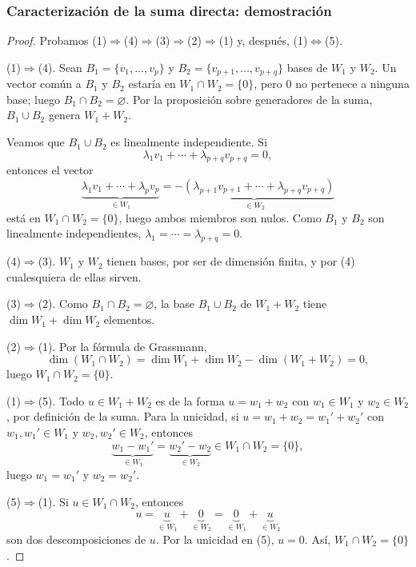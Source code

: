 \begin{frame}[allowframebreaks, t]
    \frametitle{Caracterización de la suma directa: demostración}

    \begin{proof}
        Probamos (1)$\Rightarrow$(4)$\Rightarrow$(3)$\Rightarrow$(2)$\Rightarrow$(1)
        y, después, (1)$\Leftrightarrow$(5).

        \alert{(1)$\Rightarrow$(4).} Sean $B_1=\{v_1,\ldots,v_p\}$ y
        $B_2=\{v_{p+1},\ldots,v_{p+q}\}$ bases de $W_1$ y $W_2$. Un vector común a
        $B_1$ y $B_2$ estaría en $W_1\cap W_2=\{0\}$, pero $0$ no pertenece
        a ninguna base; luego $B_1\cap B_2=\varnothing$. Por la proposición
        sobre generadores de la suma, $B_1\cup B_2$ genera $W_1+W_2$.

        Veamos que $B_1\cup B_2$ es linealmente independiente. Si
        \[
            \lambda_1v_1+\cdots+\lambda_{p+q}v_{p+q}=0,
        \]
        entonces el vector
        \[
            \underbrace{\lambda_1v_1+\cdots+\lambda_pv_p}_{\in W_1}
            =\underbrace{-(\lambda_{p+1}v_{p+1}+\cdots+\lambda_{p+q}v_{p+q})}_{\in W_2}
        \]
        está en $W_1\cap W_2=\{0\}$, luego ambos miembros son nulos. Como
        $B_1$ y $B_2$ son linealmente independientes,
        $\lambda_1=\cdots=\lambda_{p+q}=0$.

        \framebreak

        \alert{(4)$\Rightarrow$(3).} $W_1$ y $W_2$ tienen bases, por ser de
        dimensión finita, y por (4) cualesquiera de ellas sirven.

        \medskip

        \alert{(3)$\Rightarrow$(2).} Como $B_1\cap B_2=\varnothing$, la base
        $B_1\cup B_2$ de $W_1+W_2$ tiene $\dim W_1+\dim W_2$ elementos.

        \medskip

        \alert{(2)$\Rightarrow$(1).} Por la fórmula de Grassmann,
        \[
            \dim(W_1\cap W_2)=\dim W_1+\dim W_2-\dim(W_1+W_2)=0,
        \]
        luego $W_1\cap W_2=\{0\}$.

        \framebreak

        \alert{(1)$\Rightarrow$(5).} Todo $u\in W_1+W_2$ es de la forma
        $u=w_1+w_2$ con $w_1\in W_1$ y $w_2\in W_2$, por definición de la
        suma. Para la unicidad, si $u=w_1+w_2=w_1'+w_2'$ con
        $w_1,w_1'\in W_1$ y $w_2,w_2'\in W_2$, entonces
        \[
            \underbrace{w_1-w_1'}_{\in W_1}=\underbrace{w_2'-w_2}_{\in W_2}
            \in W_1\cap W_2=\{0\},
        \]
        luego $w_1=w_1'$ y $w_2=w_2'$.

        \medskip

        \alert{(5)$\Rightarrow$(1).} Si $u\in W_1\cap W_2$, entonces
        \[
            u=\underbrace{u}_{\in W_1}+\underbrace{0}_{\in W_2}
            =\underbrace{0}_{\in W_1}+\underbrace{u}_{\in W_2}
        \]
        son dos descomposiciones de $u$. Por la unicidad en (5), $u=0$.
        Así, $W_1\cap W_2=\{0\}$.
    \end{proof}
\end{frame}


